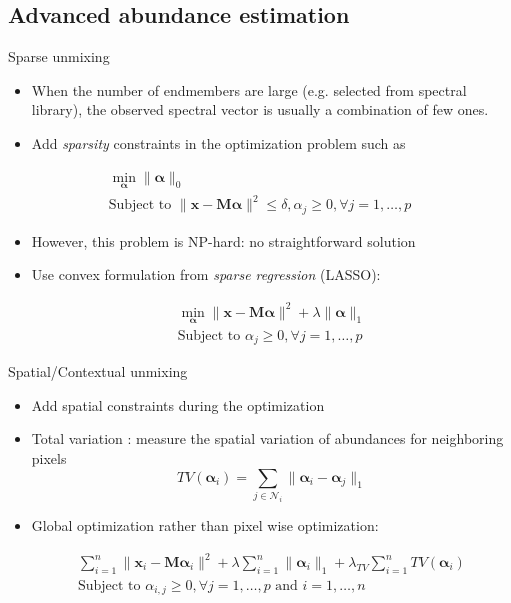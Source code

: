 \documentclass[10pt,aspectratio=1610]{beamer}
\begin{document}
\subsection{Advanced abundance estimation}
\label{sec:org19a6f2e}
\begin{frame}[label={sec:org64952ab}]{Sparse unmixing}
\begin{itemize}
\item When the number of endmembers are large (e.g. selected from spectral
library), the observed  spectral vector is usually  a combination of
few ones.
\item Add \emph{sparsity} constraints in the optimization problem such as
\end{itemize}
\begin{center}
  \begin{eqnarray*}
    \min_{\boldsymbol{\alpha}} \|\boldsymbol{\alpha}\|_{0} \\
    \text{Subject to } \|\mathbf{x}-\mathbf{M}\boldsymbol{\alpha}\|^2 \leq \delta, \alpha_j\geq 0, \forall j=1,\ldots,p
  \end{eqnarray*}
\end{center}
\begin{itemize}
\item However, this problem is NP-hard: no straightforward solution
\item Use convex formulation from \emph{sparse regression} (LASSO):
\begin{center}
\begin{eqnarray*}
\min_{\boldsymbol{\alpha}} \|\mathbf{x}-\mathbf{M}\boldsymbol{\alpha}\|^2  + \lambda \|\boldsymbol{\alpha}\|_{1}\\
\text{Subject to }\alpha_j\geq 0, \forall j=1,\ldots,p
\end{eqnarray*}
\end{center}
\end{itemize}
\end{frame}
\begin{frame}[label={sec:org7ee0b2d}]{Spatial/Contextual unmixing}
\begin{itemize}
\item Add spatial constraints during the optimization
\item Total variation \cite{DBLP:journals/tgrs/IordacheBP12}: measure the spatial variation of abundances for neighboring pixels
$$ TV(\boldsymbol{\alpha}_i) = \sum_{j\in \mathcal{N}_i} \|\boldsymbol{\alpha}_i-\boldsymbol{\alpha}_j\|_{1}$$
\item Global optimization rather than pixel wise optimization:
\begin{center}
  \begin{eqnarray*}
     \sum_{i=1}^n   \|\mathbf{x}_i-\mathbf{M}\boldsymbol{\alpha}_i\|^2 + \lambda \sum_{i=1}^n\|\boldsymbol{\alpha}_i\|_{1} + \lambda_{TV}\sum_{i=1}^nTV(\boldsymbol{\alpha}_i)\\
     \text{Subject to }\alpha_{i,j}\geq 0, \forall j=1,\ldots,p \text{ and } i=1,\ldots,n
  \end{eqnarray*}
\end{center}
\end{itemize}
\end{frame}
\end{document}
